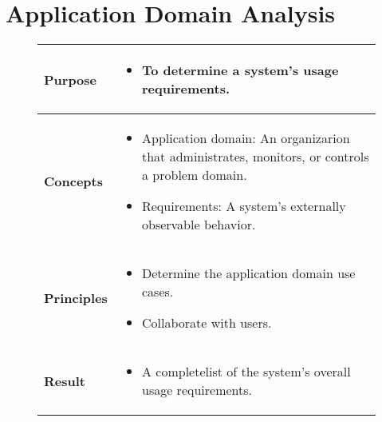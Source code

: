 \part{Application Domain Analysis}
\begin{figure}[H]
    \begin{tabular}{|l|p{12cm}|}
        \hline
        \textbf{Purpose} & \begin{itemize}
            \item To determine a system's usage requirements.
        \end{itemize} \\\hline
        \textbf{Concepts} & \begin{itemize}
            \item Application domain: An organizarion that administrates, monitors, or controls a problem domain.
            \item Requirements: A system's externally observable behavior.
        \end{itemize} \\\hline
        \textbf{Principles} & \begin{itemize}
            \item Determine the application domain use cases.
            \item Collaborate with users.
        \end{itemize} \\\hline
        \textbf{Result} & \begin{itemize}
            \item A completelist of the system's overall usage requirements.
        \end{itemize} \\\hline
    \end{tabular}
\end{figure}
